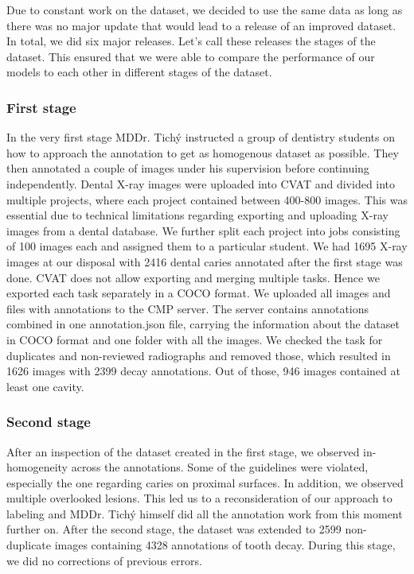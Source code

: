 Due to constant work on the dataset, we decided to use the same data as long as there was no major update that would lead to a release of an improved dataset. In total, we did six major releases. Let's call these releases the stages of the dataset. This ensured that we were able to compare the performance of our models to each other in different stages of the dataset.

\subsubsection{First stage}
\label{sec:dataset:first_stage}
In the very first stage MDDr. Tichý instructed a group of dentistry students on how to approach the annotation to get as homogenous dataset as possible. They then annotated a couple of images under his supervision before continuing independently.
Dental X-ray images were uploaded into CVAT and divided into multiple projects, where each project contained between 400-800 images. This was essential due to technical limitations regarding exporting and uploading X-ray images from a dental database. We further split each project into jobs consisting of 100 images each and assigned them to a particular student. We had 1695 X-ray images at our disposal with 2416 dental caries annotated after the first stage was done.
CVAT does not allow exporting and merging multiple tasks. Hence we exported each task separately in a COCO format. We uploaded all images and files with annotations to the CMP server. The server contains annotations combined in one annotation.json file, carrying the information about the dataset in COCO format and one folder with all the images. We checked the task for duplicates and non-reviewed radiographs and removed those, which resulted in 1626 images with 2399 decay annotations. Out of those, 946 images contained at least one cavity.


\subsubsection{Second stage}
\label{sec:dataset:second_stage}
After an inspection of the dataset created in the first stage, we observed in-homogeneity across the annotations. Some of the guidelines were violated, especially the one regarding caries on proximal surfaces. In addition, we observed multiple overlooked lesions. This led us to a reconsideration of our approach to labeling and MDDr. Tichý himself did all the annotation work from this moment further on. After the second stage, the dataset was extended to 2599 non-duplicate images containing 4328 annotations of tooth decay. During this stage, we did no corrections of previous errors.

